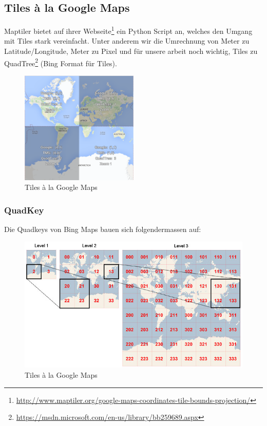 \subsection{Tiles à la Google Maps}
Maptiler bietet auf ihrer Webseite\footnote{\url{http://www.maptiler.org/google-maps-coordinates-tile-bounds-projection/}} ein Python Script an, welches den Umgang mit Tiles stark vereinfacht. Unter anderem wir die Umrechnung von Meter zu Latitude/Longitude, Meter zu Pixel und für unsere arbeit noch wichtig, Tiles zu QuadTree\footnote{\url{https://msdn.microsoft.com/en-us/library/bb259689.aspx}} (Bing Format für Tiles).

\begin{figure}[H]
\centering
\includegraphics[width=0.5\textwidth]{images/tiles_a_la_google.png}
\caption[Tiles à la Google Maps]{Tiles à la Google Maps}
\end{figure}

\subsubsection{QuadKey}
Die Quadkeys von Bing Maps bauen sich folgendermassen auf:
\begin{figure}[H]
\centering
\includegraphics[width=\textwidth]{images/quadkey.png}
\caption[Tiles à la Google Maps]{Tiles à la Google Maps}
\end{figure}